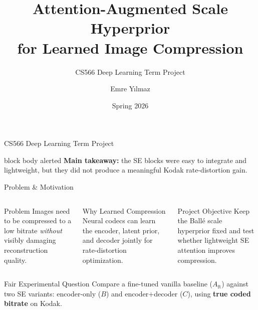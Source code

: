 \documentclass[aspectratio=169,10pt]{beamer}
\title{Attention-Augmented Scale Hyperprior\\for Learned Image Compression}
\subtitle{CS566 Deep Learning Term Project}
\author{Emre Y{\i}lmaz}
\date{Spring 2026}
\begin{document}
\begin{frame}[plain]

  \vspace*{0.55cm}
  {\large\color{Stone}CS566 Deep Learning Term Project\par}
  \vspace{0.35cm}
  {\color{Ink}\inserttitle\par}
  \vspace{0.45cm}
  {\large\color{Stone}\insertauthor\par}
  {\normalsize\color{Stone}\insertdate\par}

  \vspace{0.65cm}
  \begin{beamercolorbox}[wd=0.72\paperwidth,rounded=true,sep=0.9em,leftskip=0.25cm]{block body alerted}
    \large \textbf{Main takeaway:} the SE blocks were easy to integrate and lightweight,
    but they did not produce a meaningful Kodak rate-distortion gain.
  \end{beamercolorbox}
\end{frame}

\begin{frame}{Problem \& Motivation}
  \begin{columns}[T,onlytextwidth]
    \begin{block}{Problem}
      Images need to be compressed to a low bitrate \emph{without} visibly damaging reconstruction quality.
    \end{block}

    \begin{block}{Why Learned Compression}
      Neural codecs can learn the encoder, latent prior, and decoder jointly for rate-distortion optimization.
    \end{block}

    \begin{alertblock}{Project Objective}
      Keep the Ball\'e scale hyperprior fixed and test whether lightweight SE attention improves compression.
    \end{alertblock}
  \end{columns}

  \vspace{0.4cm}
  \begin{exampleblock}{Fair Experimental Question}
    Compare a fine-tuned vanilla baseline (\(A_{\mathrm{ft}}\)) against two SE variants:
    encoder-only (\(B\)) and encoder+decoder (\(C\)), using \textbf{true coded bitrate} on Kodak.
  \end{exampleblock}
\end{frame}
\end{document}
